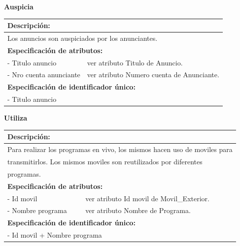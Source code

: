 \documentclass[a4paper,10pt]{article}
\begin{document}
    \begin{flushleft}
      \begin{large} \bf{Auspicia} \end{large}
    \end{flushleft}
      \begin{tabular}{| p{2cm} | p{9cm} |}
	\hline
	\multicolumn{2}{|l|}{\bf{Descripci\'on:}} \\
	\hline
	\multicolumn{2}{|l|}{Los anuncios son auspiciados por los anunciantes.} \\
	\hline	
	\multicolumn{2}{|l|}{\bf{Especificaci\'on de atributos:}} \\
	\hline
	- Titulo \newline anuncio & ver atributo Titulo de Anuncio. \\
	\hline \hline
	- Nro cuenta anunciante & ver atributo Numero cuenta de Anunciante. \\
	\hline
	\multicolumn{2}{|l|}{\bf{Especificaci\'on de identificador \'unico:}} \\
	\hline
	\multicolumn{2}{|l|}{- Titulo anuncio} \\
	\hline
      \end{tabular}


    \begin{flushleft}
      \begin{large} \bf{Utiliza} \end{large}
    \end{flushleft}
      \begin{tabular}{| p{2cm} | p{9cm} |}
	\hline
	\multicolumn{2}{|l|}{\bf{Descripci\'on:}} \\
	\hline
	\multicolumn{2}{|l|}{Para realizar los programas en vivo, los mismos hacen uso de moviles para} \\
	\multicolumn{2}{|l|}{transmitirlos. Los mismos moviles son reutilizados por diferentes} \\	
	\multicolumn{2}{|l|}{programas.} \\
	\hline	
	\multicolumn{2}{|l|}{\bf{Especificaci\'on de atributos:}} \\
	\hline
	- Id movil & ver atributo Id movil de Movil\_Exterior. \\
	\hline \hline
	- Nombre \newline programa & ver atributo Nombre de Programa. \\
	\hline
	\multicolumn{2}{|l|}{\bf{Especificaci\'on de identificador \'unico:}} \\
	\hline
	\multicolumn{2}{|l|}{- Id movil + Nombre programa} \\
	\hline
      \end{tabular}
\end{document}
